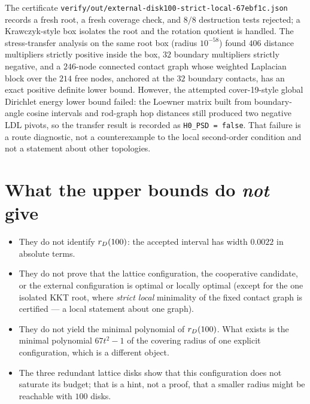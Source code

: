 The certificate {\footnotesize\texttt{verify/\allowbreak{}out/\allowbreak{}external-\allowbreak{}disk100-\allowbreak{}strict-\allowbreak{}local-\allowbreak{}67ebf1c.json}} records a fresh root,
a fresh coverage check, and $8/8$ destruction tests rejected; a Krawczyk-style box isolates the root
and the rotation quotient is handled. The stress-transfer analysis on the same root box (radius
$10^{-58}$) found $406$ distance multipliers strictly positive inside the box, $32$ boundary
multipliers strictly negative, and a $246$-node connected contact graph whose weighted Laplacian
block over the $214$ free nodes, anchored at the $32$ boundary contacts, has an exact positive
definite lower bound. However, the attempted cover-19-style global Dirichlet energy lower bound
failed: the Loewner matrix built from boundary-angle cosine intervals and rod-graph hop distances
still produced two negative LDL pivots, so the transfer result is recorded as
\texttt{H0\_\allowbreak{}PSD = false}. That failure is a route diagnostic, not a counterexample to the local
second-order condition and not a statement about other topologies.

\section{What the upper bounds do \emph{not} give}

\begin{itemize}[leftmargin=1.4em,itemsep=2pt]
\item They do not identify $r_{D}(100)$: the accepted interval has width $0.0022$ in absolute terms.
\item They do not prove that the lattice configuration, the cooperative candidate, or the external
configuration is optimal or locally optimal (except for the one isolated KKT root, where
\emph{strict local} minimality of the fixed contact graph is certified --- a local statement about
one graph).
\item They do not yield the minimal polynomial of $r_{D}(100)$. What exists is the minimal polynomial
$67t^2-1$ of the covering radius of one explicit configuration, which is a different object.
\item The three redundant lattice disks show that this configuration does not saturate its budget;
that is a hint, not a proof, that a smaller radius might be reachable with $100$ disks.
\end{itemize}
